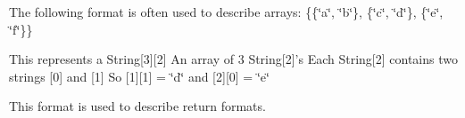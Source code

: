 The following format is often used to describe arrays\-: \{\{\char`\"{}a\char`\"{}, \char`\"{}b\char`\"{}\}, \{\char`\"{}c\char`\"{}, \char`\"{}d\char`\"{}\}, \{\char`\"{}e\char`\"{}, \char`\"{}f\char`\"{}\}\}

This represents a String\mbox{[}3\mbox{]}\mbox{[}2\mbox{]} An array of 3 String\mbox{[}2\mbox{]}'s Each String\mbox{[}2\mbox{]} contains two strings \mbox{[}0\mbox{]} and \mbox{[}1\mbox{]} So \mbox{[}1\mbox{]}\mbox{[}1\mbox{]} = \char`\"{}d\char`\"{} and \mbox{[}2\mbox{]}\mbox{[}0\mbox{]} = \char`\"{}e\char`\"{}

This format is used to describe return formats. 